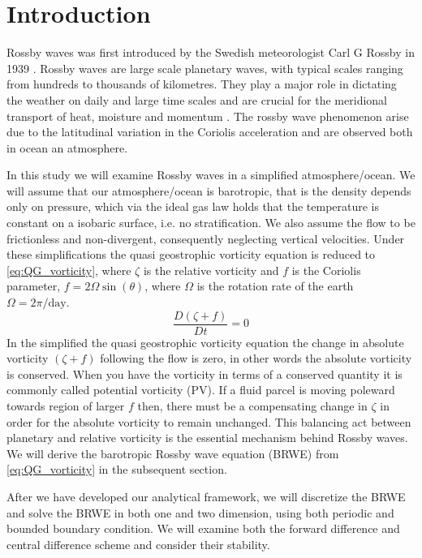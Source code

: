 \section{Introduction}
Rossby waves was first introduced by the Swedish meteorologist
Carl G Rossby in 1939 \parencite{Rossby1939}. Rossby waves are large scale
planetary waves, with typical scales ranging from 
hundreds to thousands of kilometres. They play a major role in dictating
the weather on daily and large time scales and are crucial for the meridional
transport of heat, moisture and momentum \parencite{midSynDyn}. The rossby wave phenomenon arise due to the
latitudinal variation in the Coriolis acceleration and are observed both in
ocean an atmosphere. 

In this study we will examine Rossby waves in a simplified 
atmosphere/ocean. We will assume that our atmosphere/ocean is barotropic, that
is the density depends only on pressure, which via the ideal gas law holds that
the temperature is constant on a isobaric surface, i.e. no stratification. We also assume the flow to be frictionless and
non-divergent, consequently neglecting vertical velocities. Under these
simplifications the quasi geostrophic vorticity equation is reduced to
\cref{eq:QG_vorticity}, where $\zeta$ is the relative vorticity and $f$ is the
Coriolis parameter, $f=2\Omega \sin(\theta)$, where $\Omega$ is
the rotation rate of the earth $\Omega = 2\pi/ \mathrm{day}$.
\begin{equation}\label{eq:QG_vorticity}
    \frac{D(\zeta + f)}{Dt} = 0
\end{equation}
In the simplified the quasi geostrophic vorticity equation the
change in absolute vorticity $(\zeta + f)$ following the flow is zero, in other
words the absolute vorticity is conserved. When you have the vorticity in terms
of a conserved quantity it is commonly called potential vorticity (PV). If a fluid parcel is moving
poleward towards region of larger $f$ then, there must be a compensating change
in $\zeta$ in order for the absolute vorticity to remain unchanged. This
balancing act between planetary and relative vorticity is the essential
mechanism behind
Rossby waves. We will derive the barotropic Rossby
wave equation (BRWE) from \cref{eq:QG_vorticity} in the subsequent section.

After we have developed our analytical framework, we will discretize the BRWE
and solve the BRWE in both one and two dimension, using both periodic and
bounded boundary condition. We will examine both the forward
difference and central difference scheme and consider their stability. 